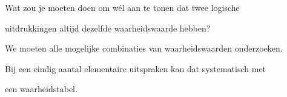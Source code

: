 \documentclass{ximera}
\begin{document}
\begin{oefening}{\oefG}
\begin{question}
\end{question}



\begin{question}

Wat zou je moeten doen om wél aan te tonen dat twee logische

uitdrukkingen altijd dezelfde waarheidswaarde hebben?

\begin{oplossing}

We moeten alle mogelijke combinaties van waarheidswaarden onderzoeken.

Bij een eindig aantal elementaire uitspraken kan dat systematisch met

een waarheidstabel.

\end{oplossing}

\end{question}

\end{oefening}
\end{document}
